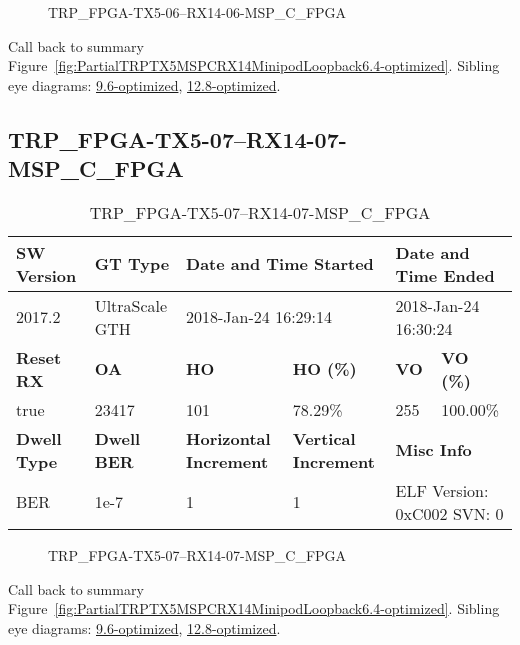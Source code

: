 \begin{figure}[h]
\caption{TRP\_FPGA-TX5-06--RX14-06-MSP\_C\_FPGA} \label{fig:TRPFPGATX506RX1406MSPCFPGA6.4-optimized}
\end{figure}

Call back to summary Figure~\ref{fig:PartialTRPTX5MSPCRX14MinipodLoopback6.4-optimized}.
Sibling eye diagrams: \hyperref[sec:TRPFPGATX506RX1406MSPCFPGA9.6-optimized]{9.6-optimized}, \hyperref[sec:TRPFPGATX506RX1406MSPCFPGA12.8-optimized]{12.8-optimized}.

\clearpage
\newpage


\subsection{TRP\_FPGA-TX5-07--RX14-07-MSP\_C\_FPGA}\label{sec:TRPFPGATX507RX1407MSPCFPGA6.4-optimized}

\begin{table}[h]
\centering
\caption{TRP\_FPGA-TX5-07--RX14-07-MSP\_C\_FPGA}
\label{tab:TRPFPGATX507RX1407MSPCFPGA6.4-optimized}
\begin{tabular}{@{}|l|l|l|l|l|l|@{}}
\toprule
\textbf{SW Version}                & \textbf{GT Type}   & \multicolumn{2}{l|}{\textbf{Date and Time Started}}            & \multicolumn{2}{l|}{\textbf{Date and Time Ended}}        \\ \midrule
2017.2                       & UltraScale GTH          & \multicolumn{2}{l|}{2018-Jan-24 16:29:14}                   & \multicolumn{2}{l|}{2018-Jan-24 16:30:24}               \\ \midrule
\textbf{Reset RX}                  & \textbf{OA} & \textbf{HO}   & \textbf{HO (\%)} & \textbf{VO} & \textbf{VO (\%)} \\ \midrule
true & 23417        & 101          & 78.29\%        & 255        & 100.00\%       \\ \midrule
\textbf{Dwell Type}                & \textbf{Dwell BER} & \textbf{Horizontal Increment} & \textbf{Vertical Increment}    & \multicolumn{2}{l|}{\textbf{Misc Info}}                  \\ \midrule
BER                            & 1e-7        & 1        & 1           & \multicolumn{2}{l|}{ELF Version: 0xC002 SVN: 0}                         \\ \bottomrule
\end{tabular}
\end{table}

\begin{figure}[h]
\caption{TRP\_FPGA-TX5-07--RX14-07-MSP\_C\_FPGA} \label{fig:TRPFPGATX507RX1407MSPCFPGA6.4-optimized}
\end{figure}

Call back to summary Figure~\ref{fig:PartialTRPTX5MSPCRX14MinipodLoopback6.4-optimized}.
Sibling eye diagrams: \hyperref[sec:TRPFPGATX507RX1407MSPCFPGA9.6-optimized]{9.6-optimized}, \hyperref[sec:TRPFPGATX507RX1407MSPCFPGA12.8-optimized]{12.8-optimized}.

\clearpage
\newpage

